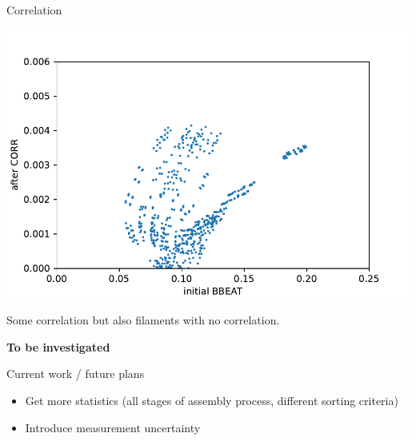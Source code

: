 \documentclass[usenames,dvipsnames,aspectratio=169,table]{beamer}
\begin{document}
\begin{frame} %
    {Correlation}

    \begin{minipage}{0.6\linewidth}
        \includegraphics[width=\linewidth]{correlation_full.pdf} 
    \end{minipage}
    \begin{minipage}{0.39\linewidth}
        Some correlation but also filaments with no correlation.

        \textbf{To be investigated}

    \end{minipage}
    
\end{frame} %


\begin{frame} %
    {Current work / future plans}


    \begin{itemize}
        \item Get more statistics (all stages of assembly process, different sorting criteria)
        \item Introduce measurement uncertainty
    \end{itemize}
    
\end{frame} %
\end{document}
